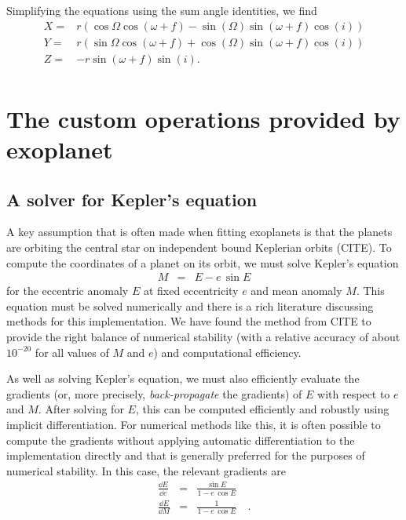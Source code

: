 \documentclass[modern]{aastex62}
\begin{document}
Simplifying the equations using the sum angle identities, we find
\begin{equation}
  \begin{array}{lc}
    X =& r (\cos \Omega \cos(\omega + f) - \sin(\Omega) \sin(\omega + f) \cos(i)) \\
    Y =& r (\sin \Omega \cos(\omega + f) + \cos(\Omega) \sin(\omega + f) \cos(i)) \\
    Z =& - r \sin(\omega + f) \sin(i).\\
\end{array}
\label{eqn:Z}
\end{equation}


\section{The custom operations provided by exoplanet}

\subsection{A solver for Kepler's equation}

A key assumption that is often made when fitting exoplanets is that the
planets are orbiting the central star on independent bound Keplerian orbits
(CITE).
To compute the coordinates of a planet on its orbit, we must solve Kepler's
equation
\begin{eqnarray}
M &=& E - e\,\sin E
\end{eqnarray}
for the eccentric anomaly $E$ at fixed eccentricity $e$ and mean anomaly $M$.
This equation must be solved numerically and there is a rich literature
discussing methods for this implementation.
We have found the method from CITE to provide the right balance of numerical
stability (with a relative accuracy of about $10^{-20}$ for all values of $M$
and $e$) and computational efficiency.

As well as solving Kepler's equation, we must also efficiently evaluate the
gradients (or, more precisely, \emph{back-propagate} the gradients) of $E$
with respect to $e$ and $M$.
After solving for $E$, this can be computed efficiently and robustly using
implicit differentiation.
For numerical methods like this, it is often possible to compute the gradients
without applying automatic differentiation to the implementation directly and
that is generally preferred for the purposes of numerical stability.
In this case, the relevant gradients are
\begin{eqnarray}
\frac{\dd E}{\dd e} &=& \frac{\sin E}{1 - e\,\cos E} \\
\frac{\dd E}{\dd M} &=& \frac{1}{1 - e\,\cos E} \quad.
\end{eqnarray}
\end{document}
